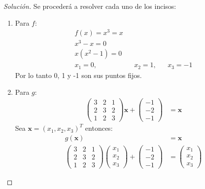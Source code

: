 \documentclass[12pt]{book}
\newenvironment{solucion}
  {\renewcommand\qedsymbol{$\square$}\begin{proof}[Solución]}
  {\end{proof}}
\begin{document}
\begin{solucion}
Se procederá a resolver cada uno de los incisos:
\renewcommand{\labelenumii}{\roman{enumii}.}
\begin{enumerate}
    \item Para $f$:
        \begin{align*}
            f(x)=x^3=x\\
            x^3-x=0 \\
            x(x^2-1)=0 \\
            x_1 = 0,&& x_2= 1,&& x_3= -1
        \end{align*}
        Por lo tanto 0, 1 y -1 son sus puntos fijos.
    \item Para $g$:
        \begin{align*}
            \begin{pmatrix}
                3&2&1\\
                2&3&2\\
                1&2&3
            \end{pmatrix}\bm{x}+\begin{pmatrix}
             -1\\-2\\-1
            \end{pmatrix}&=\bm{x}
        \end{align*}
        Sea $\bm{x}=(x_1,x_2,x_3)^T$ entonces:
        \begin{align*}
            g(\bm{x})&=\bm{x}\\
            \begin{pmatrix}
                3&2&1\\
                2&3&2\\
                1&2&3
            \end{pmatrix}\begin{pmatrix}
                x_1\\x_2\\x_3
            \end{pmatrix}+\begin{pmatrix}
                -1\\-2\\-1
            \end{pmatrix}&=\begin{pmatrix}
                x_1\\x_2\\x_3
            \end{pmatrix}
        \end{align*}

\end{enumerate}
\end{solucion}
\end{document}
